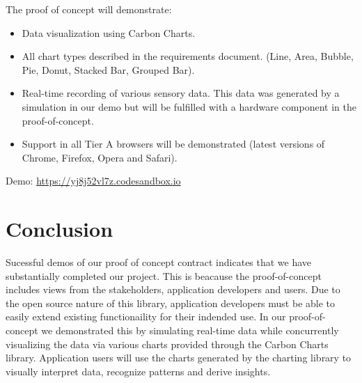 \documentclass{article}
\begin{document}
The proof of concept will demonstrate:
\begin{itemize}
    \item Data visualization using Carbon Charts.
    \item All chart types described in the requirements document. (Line, Area, Bubble, Pie, Donut, Stacked Bar, Grouped Bar).
    \item Real-time recording of various sensory data. This data was generated by a simulation in our demo but will be fulfilled with a hardware component in the proof-of-concept.
    \item Support in all Tier A browsers will be demonstrated (latest versions of Chrome, Firefox, Opera and Safari).
\end{itemize}

Demo: \href{https://yj8j52vl7z.codesandbox.io}{https://yj8j52vl7z.codesandbox.io}

\section{Conclusion}
Sucessful demos of our proof of concept contract indicates that we have substantially completed our project. This is beacause the proof-of-concept includes views from the stakeholders, application developers and users. Due to the open source nature of this library, application developers must be able to easily extend existing functionaility for their indended use. In our proof-of-concept we demonstrated this by simulating real-time data while concurrently visualizing the data via various charts provided through the Carbon Charts library. Application users will use the charts generated by the charting library to visually interpret data, recognize patterns and derive insights.
\end{document}
